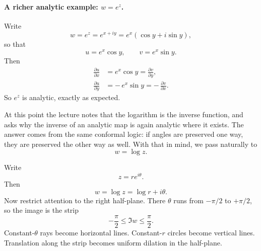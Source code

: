 \paragraph{A richer analytic example: \(w=e^z\).} Write
\begin{equation}
w=e^z=e^{x+iy}=e^x(\cos y+i\sin y),
\end{equation}
so that
\begin{equation}
u=e^x\cos y,
\qquad
v=e^x\sin y.
\end{equation}
Then
\begin{align}
\frac{\partial u}{\partial x}
&=
e^x\cos y
=
\frac{\partial v}{\partial y},
\\
\frac{\partial u}{\partial y}
&=
-\,e^x\sin y
=
-\,\frac{\partial v}{\partial x}.
\end{align}
So \(e^z\) is analytic, exactly as expected.

At this point the lecture notes that the logarithm is the inverse function, and asks why the inverse of an analytic map is again analytic where it exists. The answer comes from the same conformal logic: if angles are preserved one way, they are preserved the other way as well. With that in mind, we pass naturally to
\begin{equation}
w=\log z.
\end{equation}

Write
\begin{equation}
z=re^{i\theta}.
\end{equation}
Then
\begin{equation}
w=\log z=\log r+i\theta.
\end{equation}
Now restrict attention to the right half-plane. There \(\theta\) runs from \(-\pi/2\) to \(+\pi/2\), so the image is the strip
\begin{equation}
-\frac{\pi}{2}\leq \Im w \leq \frac{\pi}{2}.
\end{equation}
Constant-\(\theta\) rays become horizontal lines. Constant-\(r\) circles become vertical lines. Translation along the strip becomes uniform dilation in the half-plane.

